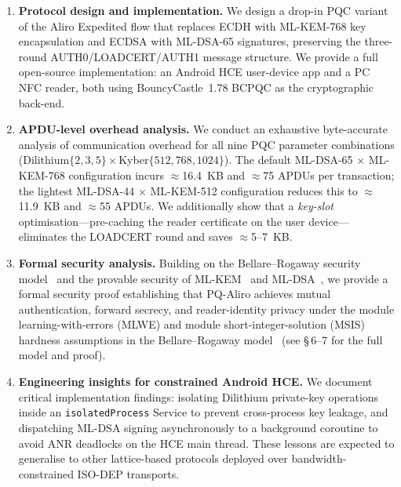 \begin{enumerate}

\item \textbf{Protocol design and implementation.}
We design a drop-in PQC variant of the Aliro Expedited flow that replaces ECDH with ML-KEM-768 key encapsulation and ECDSA with ML-DSA-65 signatures, preserving the three-round AUTH0/LOADCERT/AUTH1 message structure. We provide a full open-source implementation: an Android HCE user-device app and a PC NFC reader, both using BouncyCastle~1.78 BCPQC as the cryptographic back-end.

\item \textbf{APDU-level overhead analysis.}
We conduct an exhaustive byte-accurate analysis of communication overhead for all nine PQC parameter combinations (Dilithium$\{2,3,5\} \times $Kyber$\{512,768,1024\}$). The default ML-DSA-65 $\times$ ML-KEM-768 configuration incurs $\approx$16.4~KB and $\approx$75 APDUs per transaction; the lightest ML-DSA-44 $\times$ ML-KEM-512 configuration reduces this to $\approx$11.9~KB and $\approx$55 APDUs. We additionally show that a \emph{key-slot} optimisation---pre-caching the reader certificate on the user device---eliminates the LOADCERT round and saves $\approx$5--7~KB.

\item \textbf{Formal security analysis.}
Building on the Bellare--Rogaway security model~\cite{C:BelRog93} and the provable security of ML-KEM~\cite{EuroSP:BDKLLSSSS18} and ML-DSA~\cite{TCHES:DKLLSSS18}, we provide a formal security proof establishing that PQ-Aliro achieves mutual authentication, forward secrecy, and reader-identity privacy under the module learning-with-errors (MLWE) and module short-integer-solution (MSIS) hardness assumptions in the Bellare--Rogaway model~\cite{C:BelRog93} (see \S\,6--7 for the full model and proof).

\item \textbf{Engineering insights for constrained Android HCE.}
We document critical implementation findings: isolating Dilithium private-key operations inside an \texttt{isolatedProcess} Service to prevent cross-process key leakage, and dispatching ML-DSA signing asynchronously to a background coroutine to avoid ANR deadlocks on the HCE main thread. These lessons are expected to generalise to other lattice-based protocols deployed over bandwidth-constrained ISO-DEP transports.

\end{enumerate}

